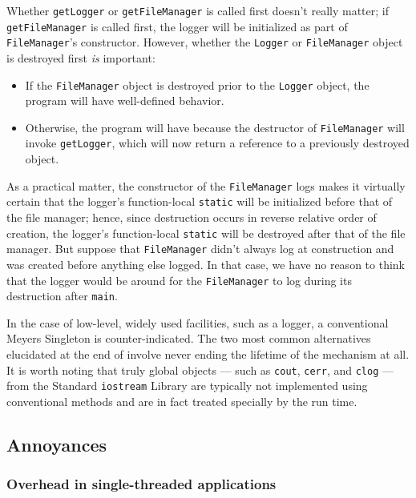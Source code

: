 \noindent Whether \lstinline!getLogger! or \lstinline!getFileManager! is called first
doesn't really matter; if \lstinline!getFileManager! is called first, the
logger will be initialized as part of \lstinline!FileManager!'s
constructor. However, whether the \lstinline!Logger! or
\lstinline!FileManager! object is destroyed first \emph{is} important:

\begin{itemize}
\item{If the \lstinline!FileManager! object is destroyed prior to the \lstinline!Logger! object, the program will have well-defined behavior.}
\item{Otherwise, the program will have  because the destructor of \lstinline!FileManager! will invoke \lstinline!getLogger!, which will now return a reference to a previously destroyed object.}
\end{itemize}

As a practical matter, the constructor of the \lstinline!FileManager! logs
makes it virtually certain that the logger's function-local
\lstinline!static! will be initialized before that of the file manager;
hence, since destruction occurs in reverse relative order of creation,
the logger's function-local \lstinline!static! will be destroyed after that
of the file manager. But suppose that \lstinline!FileManager! didn't always
log at construction and was created before anything else logged. In that
case, we have no reason to think that the logger would be around for the
\lstinline!FileManager! to log during its destruction after \lstinline!main!.

In the case of low-level, widely used facilities, such as a logger, a
conventional Meyers Singleton is counter-indicated. The two most common
alternatives elucidated at the end of  involve never ending the lifetime of
the mechanism at all. It is worth noting that truly global objects ---
such as \lstinline!cout!, \lstinline!cerr!, and \lstinline!clog! --- from the
Standard \lstinline!iostream! Library are typically not implemented using
conventional methods and are in fact treated specially by the run time.

\subsection[Annoyances]{Annoyances}\label{annoyances}

\subsubsection[Overhead in single-threaded applications]{Overhead in single-threaded applications}\label{overhead-in-single-threaded-applications}

